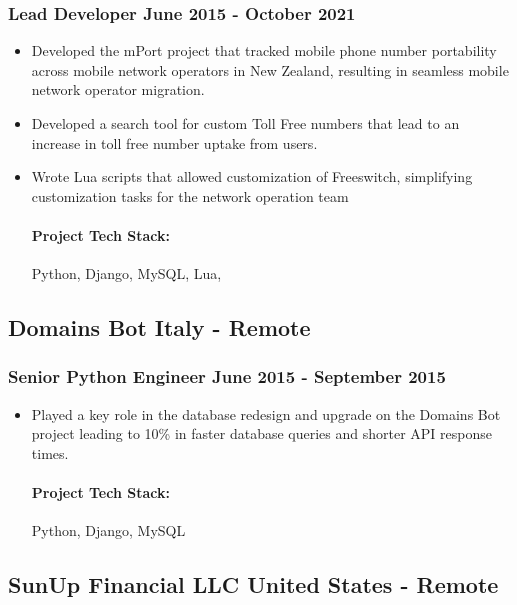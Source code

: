 \documentclass[11pt]{article} %
\begin{document}
\subsubsection{Lead Developer \hfill  June 2015 - October 2021}
\begin{itemize}
    \item Developed the mPort project that tracked mobile phone number portability across mobile network operators in New Zealand, resulting in seamless mobile network operator migration.
    \item Developed a search tool for custom Toll Free numbers that lead to an increase in toll free number uptake from users.
    \item Wrote Lua scripts that allowed customization of Freeswitch, simplifying customization tasks for the network operation team 

    \paragraph{Project Tech Stack:} Python, Django, MySQL, Lua,
\end{itemize}

\subsection{Domains Bot \hfill Italy - Remote}
\subsubsection{Senior Python Engineer \hfill  June 2015 - September 2015}
\begin{itemize}
    \item Played a key role in the database redesign and upgrade on the Domains Bot project leading to 10\% in faster database queries and shorter API response times.

    \paragraph{Project Tech Stack:} Python, Django, MySQL
\end{itemize}

\subsection{SunUp Financial LLC \hfill United States - Remote}
\end{document}
